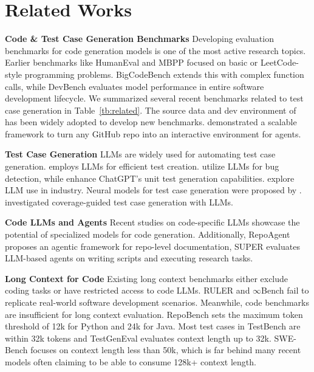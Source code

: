 
\section{Related Works}


\textbf{Code \& Test Case Generation Benchmarks}\quad
\iffalse The development of benchmarks for evaluating code generation models has been active. \fi Developing evaluation benchmarks for code generation models is one of the most active research topics.
Earlier benchmarks like HumanEval \cite{chen2021evaluating} and MBPP \cite{austin2021program} focused on basic or LeetCode-style programming problems. BigCodeBench \cite{zhuo2024bigcodebench} extends this with complex function calls, while DevBench \cite{devbench} evaluates model performance in entire software development lifecycle. 
We summarized several recent benchmarks related to test case generation in Table~\ref{tb:related}. The source data and dev environment of \citet{swebench} has been widely adopted to develop new benchmarks. \citet{r2e} demonstrated a scalable framework to turn any GitHub repo into an interactive environment for agents.


\textbf{Test Case Generation}\quad
LLMs are widely used for automating test case generation. \citet{chatunitest} employs LLMs for efficient test creation. \citet{liu2024llm} utilize LLMs for bug detection, while \citet{tang2024chatgpt,yuan2024evaluating} enhance ChatGPT's unit test generation capabilities. \citet{alshahwan2024automated} explore LLM use in industry. Neural models for test case generation were proposed by \citet{tufano2020unit,nie2023learning}. \citet{ryan2024code} investigated coverage-guided test case generation with LLMs.

\textbf{Code LLMs and Agents}\quad
Recent studies on code-specific LLMs \cite{codellama,starcoder2,hui2024qwen2} showcase the potential of specialized models for code generation. \iffalse The StarCoder 2 \cite{starcoder2} and open code models based on GEMMA \cite{team2024codegemma} show the evolution of LLMs tailored for programming tasks. \fi Additionally, RepoAgent \cite{luo2024repoagent} proposes an agentic framework for repo-level documentation, SUPER \cite{bogin2024superevaluatingagentssetting} evaluates LLM-based agents on writing scripts and executing research tasks.

\textbf{Long Context for Code}\quad
Existing long context benchmarks either exclude coding tasks or have restricted access to code LLMs. RULER \cite{hsieh2024ruler} and $\infty$Bench \cite{zhang-etal-2024-bench} fail to replicate real-world software development scenarios. Meanwhile, code benchmarks are insufficient for long context evaluation. RepoBench \cite{repobench} sets the maximum token threshold of 12k for Python and 24k for Java. Most test cases in TestBench \cite{testbench} are within 32k tokens and TestGenEval \cite{jain2024testgenevalrealworldunit} evaluates context length up to 32k. SWE-Bench \cite{swebench} focuses on context length less than 50k, which is far behind many recent models often claiming to be able to consume 128k+ context length.




